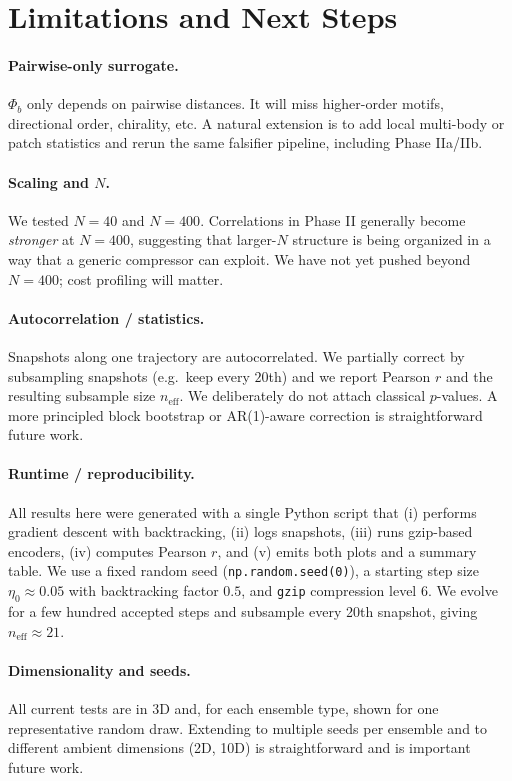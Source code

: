 \documentclass[11pt,a4paper]{article}
\numberwithin{equation}{section}
\newcommand{\phib}{\Phi_b}
\begin{document}
\section{Limitations and Next Steps}
\paragraph{Pairwise-only surrogate.}
$\phib$ only depends on pairwise distances. It will miss higher-order motifs, directional order, chirality, etc. A natural extension is to add local multi-body or patch statistics and rerun the same falsifier pipeline, including Phase IIa/IIb.

\paragraph{Scaling and $N$.}
We tested $N{=}40$ and $N{=}400$. Correlations in Phase II generally become \emph{stronger} at $N{=}400$, suggesting that larger-$N$ structure is being organized in a way that a generic compressor can exploit. We have not yet pushed beyond $N{=}400$; cost profiling will matter.

\paragraph{Autocorrelation / statistics.}
Snapshots along one trajectory are autocorrelated. We partially correct by subsampling snapshots (e.g.\ keep every $20$th) and we report Pearson $r$ and the resulting subsample size $n_{\text{eff}}$. We deliberately do not attach classical $p$-values. A more principled block bootstrap or AR(1)-aware correction is straightforward future work.

\paragraph{Runtime / reproducibility.}
All results here were generated with a single Python script that (i) performs gradient descent with backtracking, (ii) logs snapshots, (iii) runs gzip-based encoders, (iv) computes Pearson $r$, and (v) emits both plots and a summary table. We use a fixed random seed (\texttt{np.random.seed(0)}), a starting step size $\eta_0 \approx 0.05$ with backtracking factor $0.5$, and \texttt{gzip} compression level 6. We evolve for a few hundred accepted steps and subsample every 20th snapshot, giving $n_{\text{eff}}\approx 21$.

\paragraph{Dimensionality and seeds.}
All current tests are in 3D and, for each ensemble type, shown for one representative random draw. Extending to multiple seeds per ensemble and to different ambient dimensions (2D, 10D) is straightforward and is important future work.
\end{document}
